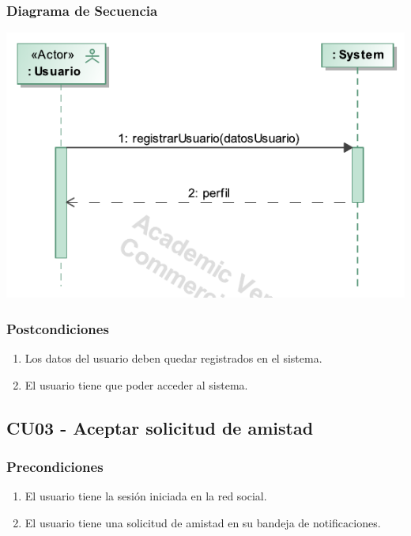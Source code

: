 \documentclass[12pt, a4paper, titlepage]{article}
\begin{document}
\subsubsection{Diagrama de Secuencia}
\begin{center}
	\includegraphics[width=\textwidth]{Imagenes/registrarUsuario}
\end{center}

\subsubsection{Postcondiciones}
\begin{enumerate}
	\item Los datos del usuario deben quedar registrados en el sistema.
	\item El usuario tiene que poder acceder al sistema.
\end{enumerate}


\subsection{CU03 - Aceptar solicitud de amistad}

\subsubsection{Precondiciones}
\begin{enumerate}
	\item El usuario tiene la sesión iniciada en la red social.
	\item El usuario tiene una solicitud de amistad en su bandeja de notificaciones.
\end{enumerate}
\end{document}

